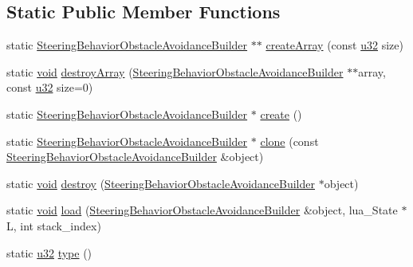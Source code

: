\subsection*{Static Public Member Functions}
\begin{DoxyCompactItemize}
\item 
static \mbox{\hyperlink{classnjli_1_1_steering_behavior_obstacle_avoidance_builder}{Steering\+Behavior\+Obstacle\+Avoidance\+Builder}} $\ast$$\ast$ \mbox{\hyperlink{classnjli_1_1_steering_behavior_obstacle_avoidance_builder_a1804ba7112f1b99ce664e0a011038865}{create\+Array}} (const \mbox{\hyperlink{_util_8h_a10e94b422ef0c20dcdec20d31a1f5049}{u32}} size)
\item 
static \mbox{\hyperlink{_thread_8h_af1e856da2e658414cb2456cb6f7ebc66}{void}} \mbox{\hyperlink{classnjli_1_1_steering_behavior_obstacle_avoidance_builder_aee8bf156a385d71d1568c84adaf054b9}{destroy\+Array}} (\mbox{\hyperlink{classnjli_1_1_steering_behavior_obstacle_avoidance_builder}{Steering\+Behavior\+Obstacle\+Avoidance\+Builder}} $\ast$$\ast$array, const \mbox{\hyperlink{_util_8h_a10e94b422ef0c20dcdec20d31a1f5049}{u32}} size=0)
\item 
static \mbox{\hyperlink{classnjli_1_1_steering_behavior_obstacle_avoidance_builder}{Steering\+Behavior\+Obstacle\+Avoidance\+Builder}} $\ast$ \mbox{\hyperlink{classnjli_1_1_steering_behavior_obstacle_avoidance_builder_ad122d39203a8b5e26325b35f7d7b839b}{create}} ()
\item 
static \mbox{\hyperlink{classnjli_1_1_steering_behavior_obstacle_avoidance_builder}{Steering\+Behavior\+Obstacle\+Avoidance\+Builder}} $\ast$ \mbox{\hyperlink{classnjli_1_1_steering_behavior_obstacle_avoidance_builder_aaf913b46a7f73b5b7979b574f9da2d73}{clone}} (const \mbox{\hyperlink{classnjli_1_1_steering_behavior_obstacle_avoidance_builder}{Steering\+Behavior\+Obstacle\+Avoidance\+Builder}} \&object)
\item 
static \mbox{\hyperlink{_thread_8h_af1e856da2e658414cb2456cb6f7ebc66}{void}} \mbox{\hyperlink{classnjli_1_1_steering_behavior_obstacle_avoidance_builder_a7f2e82b1b5459411bc9082a812e53809}{destroy}} (\mbox{\hyperlink{classnjli_1_1_steering_behavior_obstacle_avoidance_builder}{Steering\+Behavior\+Obstacle\+Avoidance\+Builder}} $\ast$object)
\item 
static \mbox{\hyperlink{_thread_8h_af1e856da2e658414cb2456cb6f7ebc66}{void}} \mbox{\hyperlink{classnjli_1_1_steering_behavior_obstacle_avoidance_builder_a51471778f358264a1c49efcac6da28a6}{load}} (\mbox{\hyperlink{classnjli_1_1_steering_behavior_obstacle_avoidance_builder}{Steering\+Behavior\+Obstacle\+Avoidance\+Builder}} \&object, lua\+\_\+\+State $\ast$L, int stack\+\_\+index)
\item 
static \mbox{\hyperlink{_util_8h_a10e94b422ef0c20dcdec20d31a1f5049}{u32}} \mbox{\hyperlink{classnjli_1_1_steering_behavior_obstacle_avoidance_builder_a381b8adffc534976447306e64afbba18}{type}} ()
\end{DoxyCompactItemize}
